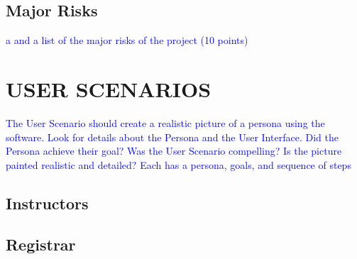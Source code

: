\documentclass[11pt]{article}
\begin{document}
\subsection{Major Risks} %
\textcolor{blue}{a and a list of the major risks of the project (10 points)}


\section{USER SCENARIOS}  %
\textcolor{blue}{The User Scenario should create a realistic picture of a persona using the software.  
Look for details about the Persona and the User Interface.  
Did the Persona achieve their goal?  
Was the User Scenario compelling?  
Is the picture painted realistic and detailed?
Each has a persona, goals, and sequence of steps}
\subsection{Instructors} %
\subsection{Registrar}  %
\end{document}
